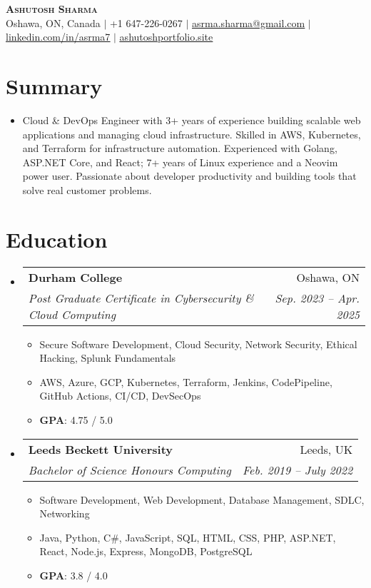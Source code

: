 \documentclass[letterpaper,11pt]{article}
\makeatletter
\newcommand{\resumeItem}[1]{
  \item\small{
    {#1 \vspace{-2pt}}
  }
}
\newcommand{\resumeSubheading}[4]{
  \vspace{-2pt}\item
    \begin{tabular*}{0.97\textwidth}[t]{l@{\extracolsep{\fill}}r}
      \textbf{#1} & #2 \\
      \textit{\small#3} & \textit{\small #4} \\
    \end{tabular*}\vspace{-7pt}
}
\newcommand{\resumeSubHeadingListStart}{\begin{itemize}[leftmargin=0.15in, label={}]}
\newcommand{\resumeSubHeadingListEnd}{\end{itemize}}
\newcommand{\resumeItemListStart}{\begin{itemize}}
\newcommand{\resumeItemListEnd}{\end{itemize}\vspace{-5pt}}
\makeatother
\begin{document}

\begin{center}
    \textbf{\Huge \scshape Ashutosh Sharma} \\ \vspace{1pt}
    {Oshawa, ON, Canada} $|$
    \small +1 647-226-0267 $|$ \href{mailto:asrma.sharma@gmail.com}{\underline{asrma.sharma@gmail.com}} $|$ 
    \href{https://linkedin.com/in/asrma7}{\underline{linkedin.com/in/asrma7}} $|$
    \href{https://ashutoshportfolio.site}{\underline{ashutoshportfolio.site}}
\end{center}

\section{Summary}
  \resumeSubHeadingListStart
    \item{
      Cloud \& DevOps Engineer with 3+ years of experience building scalable web applications and managing cloud infrastructure. Skilled in AWS, Kubernetes, and Terraform for infrastructure automation. Experienced with Golang, ASP.NET Core, and React; 7+ years of Linux experience and a Neovim power user. Passionate about developer productivity and building tools that solve real customer problems.
    }
  \resumeSubHeadingListEnd

\section{Education}
  \resumeSubHeadingListStart
    \resumeSubheading
      {Durham College}{Oshawa, ON}
      {Post Graduate Certificate in Cybersecurity \& Cloud Computing}{Sep. 2023 -- Apr. 2025}
      \resumeItemListStart
        \resumeItem{Secure Software Development, Cloud Security, Network Security, Ethical Hacking, Splunk Fundamentals}
        \resumeItem{AWS, Azure, GCP, Kubernetes, Terraform, Jenkins, CodePipeline, GitHub Actions, CI/CD, DevSecOps}
        \resumeItem{\textbf{GPA}: 4.75 / 5.0}
      \resumeItemListEnd

    \resumeSubheading
      {Leeds Beckett University}{Leeds, UK}
      {Bachelor of Science Honours Computing}{Feb. 2019 -- July 2022}
        \resumeItemListStart
            \resumeItem{Software Development, Web Development, Database Management, SDLC, Networking}
            \resumeItem{Java, Python, C\#, JavaScript, SQL, HTML, CSS, PHP, ASP.NET, React, Node.js, Express, MongoDB, PostgreSQL}
            \resumeItem{\textbf{GPA}: 3.8 / 4.0}
        \resumeItemListEnd
  \resumeSubHeadingListEnd
\end{document}
